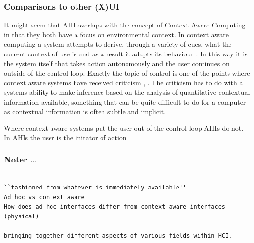 \subsubsection{Comparisons to other (X)UI} 
It might seem that AHI overlaps with the concept of Context Aware Computing in that they both have a focus on environmental context.
In context aware computing a system attempts to derive, through a variety of cues, what the current context of use is and as a result it adapts its behaviour \citep[chap. 8]{krumm2009ubiquitous}. 
In this way it is the system itself that takes action autonomously and the user continues on outside of the control loop. 
Exactly the topic of control is one of the points where context aware systems have received criticism \cite{erickson2002some}, \citep[chap. 8]{krumm2009ubiquitous}.
The criticism has to do with a systems ability to make inference based on the analysis of quantitative contextual information available, something that can be quite difficult to do for a computer as contextual information is often subtle and implicit.

Where context aware systems put the user out of the control loop AHIs do not.
In AHIs the user is the initator of action.
\blank
{}
\blank
{}  
\blank
\subsubsection{Noter \dots  } 
\begin{verbatim}

``fashioned from whatever is immediately available''
Ad hoc vs context aware
How does ad hoc interfaces differ from context aware interfaces (physical)

bringing together different aspects of various fields within HCI.

\end{verbatim} 
